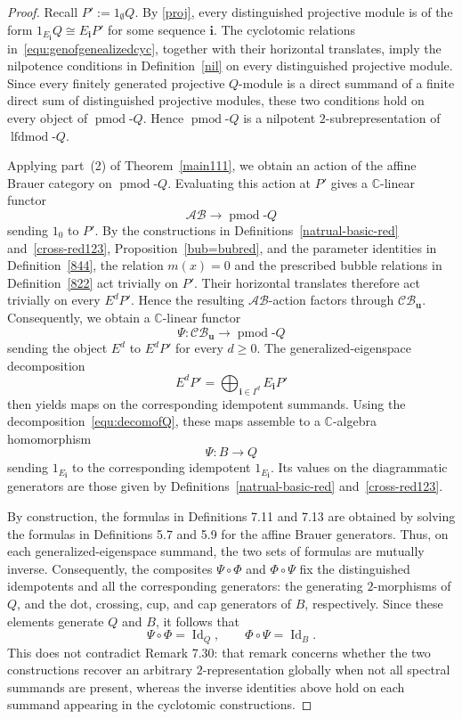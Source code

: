 \documentclass[a4,10pt]{amsart}
\numberwithin{equation}{section}
\theoremstyle{definition}
\begin{document}
\begin{proof}
Recall $
P':=1_{\emptyset}Q$. By \eqref{proj}, 
every distinguished projective module is of the form
$
1_{E_{\mathbf i}}Q\cong E_{\mathbf i}P'
$
for some sequence $\mathbf i$. The cyclotomic relations
in~\eqref{equ:genofgenealizedcyc}, together with their
horizontal translates, imply the  nilpotence conditions in
Definition~\ref{nil} on every distinguished projective module.
Since every finitely generated projective $Q$-module is a
direct summand of a finite direct sum of distinguished
projective modules, these two conditions hold on every object
of $\operatorname{pmod}\text{-}Q$. Hence
$\operatorname{pmod}\text{-}Q$ is a nilpotent
$2$-subrepresentation of $\operatorname{lfdmod}\text{-}Q$.

Applying part~(2) of Theorem~\ref{main111}, we obtain an action
of the affine Brauer category on
$\operatorname{pmod}\text{-}Q$. Evaluating this action at $P'$
gives a $\mathbb C$-linear functor
\[
\mathcal{AB}
\longrightarrow
\operatorname{pmod}\text{-}Q
\]
sending $1_0$ to $P'$.
By the constructions in
Definitions~\ref{natrual-basic-red}
and~\ref{cross-red123},
Proposition~\ref{bub=bubred}, and the parameter identities in
Definition~\ref{844}, the relation
$
m(x)=0
$
and the prescribed bubble relations in
Definition~\ref{822} act trivially on $P'$. Their horizontal
translates therefore act trivially on every $E^dP'$. Hence the
resulting $\mathcal{AB}$-action factors through
$\mathcal{CB}_{\mathbf u}$.
Consequently, we obtain a $\mathbb C$-linear functor
\[
\Psi:
\mathcal{CB}_{\mathbf u}
\longrightarrow
\operatorname{pmod}\text{-}Q
\]
sending the object $E^d$ to $E^dP'$ for every $d\geq0$.
The generalized-eigenspace decomposition
\[
E^dP'
=
\bigoplus_{\mathbf i\in I^d}E_{\mathbf i}P'
\]
then yields maps on the corresponding idempotent summands.
Using the decomposition~\eqref{equ:decomofQ}, these maps
assemble to a $\mathbb C$-algebra homomorphism
\[
\Psi:B\longrightarrow Q
\]
sending $1_{E_{\mathbf i}}$ to the corresponding idempotent
$1_{E_{\mathbf i}}$. Its values on the diagrammatic generators
are those given by
Definitions~\ref{natrual-basic-red}
and~\ref{cross-red123}.

By construction, the formulas in Definitions 7.11 and 7.13 are obtained by solving the formulas in Definitions 5.7 and 5.9 for the affine Brauer generators. Thus, on each generalized-eigenspace summand, the two sets of formulas are mutually inverse. Consequently, the composites \(\Psi\circ\Phi\) and \(\Phi\circ\Psi\) fix the distinguished idempotents and all the corresponding generators: the generating \(2\)-morphisms of \(Q\), and the dot, crossing, cup, and cap generators of \(B\), respectively. Since these elements generate \(Q\) and \(B\), it follows that
\[
 \Psi\circ\Phi=\operatorname{Id}_{Q},
 \qquad
 \Phi\circ\Psi=\operatorname{Id}_{B}.
 \]
This does not contradict Remark 7.30: that remark concerns whether the two constructions recover an arbitrary \(2\)-representation globally when not all spectral summands are present, whereas the inverse identities above hold on each summand appearing in the cyclotomic constructions.



\end{proof}
\end{document}
